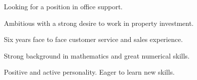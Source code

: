 

\begin{cventries}

  \cventry
    {} %
    {} %
    {} %
    {} %
    {
      \begin{cvitems} %
      \item Looking for a position in office support.
      \item Ambitious with a strong desire to work in property investment.
      \item Six years face to face customer service and sales experience.
      \item Strong background in mathematics and great numerical skills.
      \item Positive and active personality.  Eager to learn new skills.
      \end{cvitems}
    }


\end{cventries}
